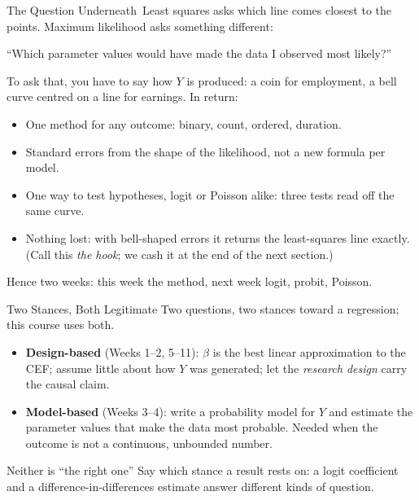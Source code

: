 \documentclass[aspectratio=169,11pt,xcolor=dvipsnames]{beamer}
\newcommand{\core}{\,\raisebox{0.6pt}{\textcolor{corestar}{$\bigstar$}}}
\begin{document}
\begin{frame}{The Question Underneath\core}
Least squares asks which line comes closest to the points. Maximum
likelihood asks something different:
\begin{center}
\alert{``Which parameter values would have made the data I observed most likely?''}
\end{center}
To ask that, you have to say how $Y$ is produced: a coin for employment, a
bell curve centred on a line for earnings. In return:
\begin{itemize}\itemsep2pt
  \item One method for any outcome: binary, count, ordered, duration.
  \item Standard errors from the shape of the likelihood, not a new formula
        per model.
  \item One way to test hypotheses, logit or Poisson alike: three tests
        read off the same curve.
  \item Nothing lost: with bell-shaped errors it returns the least-squares
        line exactly. (Call this \emph{the hook}; we cash it at the end of
        the next section.)
\end{itemize}
\vskip6pt
Hence two weeks: this week the method, next week logit, probit, Poisson.
\end{frame}

\begin{frame}{Two Stances, Both Legitimate}
Two questions, two stances toward a regression; this course uses both.
\begin{itemize}\itemsep4pt
  \item \textbf{Design-based} (Weeks 1--2, 5--11): $\beta$ is the best
        linear approximation to the CEF; assume little about how $Y$ was
        generated; let the \emph{research design} carry the causal claim.
  \item \textbf{Model-based} (Weeks 3--4): write a probability model for
        $Y$ and estimate the parameter values that make the data most
        probable. Needed when the outcome is not a continuous, unbounded number.
\end{itemize}
\vskip4pt
\begin{block}{Neither is ``the right one''}
Say which stance a result rests on: a logit coefficient and a
difference-in-differences estimate answer different kinds of question.
\end{block}
\end{frame}

\end{document}
